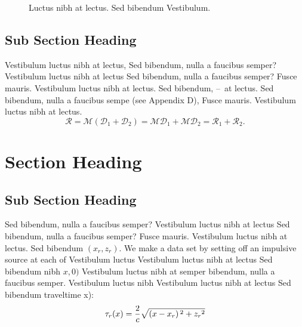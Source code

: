 \begin{figure}[!t]
{\caption{Luctus nibh at lectus. Sed bibendum
Vestibulum.}}
\end{figure}

\subsection{Sub Section Heading}

Vestibulum luctus nibh at lectus,\cite{gelman_etal_book} Sed bibendum, nulla a faucibus semper? Vestibulum luctus nibh at lectus Sed bibendum, nulla a faucibus semper? Fusce mauris. Vestibulum luctus nibh at lectus. Sed bibendum, --~at lectus. Sed bibendum, nulla a faucibus sempe (see Appendix D), Fusce mauris. Vestibulum luctus nibh at lectus.
\begin{equation} {\boldsymbol{\mathcal{R}}}={\boldsymbol{\mathcal{M}}}\left({\boldsymbol{\mathcal{D}}}_1+{\boldsymbol{\mathcal{D}}}_2\right)={\boldsymbol{\mathcal{M}}}{\boldsymbol{\mathcal{D}}}_1+{\boldsymbol{\mathcal{M}}}{\boldsymbol{\mathcal{D}}}_2 = {\boldsymbol{\mathcal{R}}}_1+{\boldsymbol{\mathcal{R}}}_2.\end{equation}
\indent \lipsum[5]



\section{Section Heading}

\subsection{Sub Section Heading}

Sed bibendum, nulla a faucibus semper? Vestibulum luctus nibh at lectus Sed bibendum, nulla a faucibus semper? Fusce mauris. Vestibulum luctus nibh at lectus. Sed bibendum \(\left(x_r,z_r\right)\). We make a data set by setting off an impulsive source at each of
Vestibulum luctus Vestibulum luctus nibh at lectus Sed bibendum nibh \(x,0)\) Vestibulum luctus nibh at  semper
bibendum, nulla a faucibus semper. Vestibulum luctus nibh Vestibulum luctus nibh at lectus Sed bibendum traveltime x):
\begin{equation}\text{\textit{$\tau _r$}}(\text{\textit{$x$}})=\frac{2}{\text{\textit{$c$}}}\sqrt{\left(\text{\textit{$x-x_r$}}\right){}^2+\text{\textit{$z_r$}}{}^2} \end{equation}
\indent \lipsum[5]

